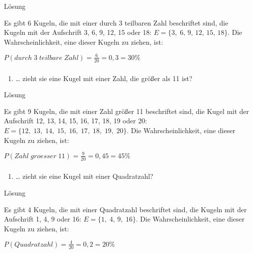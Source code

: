 \documentclass[
  ngerman,
]{book}
\providecommand{\tightlist}{%
  \setlength{\itemsep}{0pt}\setlength{\parskip}{0pt}}
\begin{document}
Lösung

Es gibt 6 Kugeln, die mit einer durch 3 teilbaren Zahl beschriftet sind, die Kugeln mit der Aufschrift 3, 6, 9, 12, 15 oder 18: \(E=\{3,\;6,\,9,\,12,\,15,\,18\}\). Die Wahrscheinlichkeit, eine dieser Kugeln zu ziehen, ist:

\(P(durch\;3\;teilbare\;Zahl)=\frac{6}{20}=0,3=30\%\)

\hypertarget{section-89}{%
\subsubsection*{}\label{section-89}}

\begin{enumerate}
\def\labelenumi{\alph{enumi})}
\setcounter{enumi}{2}
\tightlist
\item
  \ldots{} zieht sie eine Kugel mit einer Zahl, die größer als 11 ist?
\end{enumerate}

Lösung

Es gibt 9 Kugeln, die mit einer Zahl größer 11 beschriftet sind, die Kugel mit der Aufschrift 12, 13, 14, 15, 16, 17, 18, 19 oder 20: \(E=\{12,\;13,\;14,\;15,\;16,\;17,\;18,\;19,\;20\}\). Die Wahrscheinlichkeit, eine dieser Kugeln zu ziehen, ist:

\(P(Zahl\;groesser\;11)=\frac{9}{20}=0,45=45\%\)

\hypertarget{section-90}{%
\subsubsection*{}\label{section-90}}

\begin{enumerate}
\def\labelenumi{\alph{enumi})}
\setcounter{enumi}{3}
\tightlist
\item
  \ldots{} zieht sie eine Kugel mit einer Quadratzahl?
\end{enumerate}

Lösung

Es gibt 4 Kugeln, die mit einer Quadratzahl beschriftet sind, die Kugeln mit der Aufschrift 1, 4, 9 oder 16: \(E=\{1,\;4,\,9,\;16\}\). Die Wahrscheinlichkeit, eine dieser Kugeln zu ziehen, ist:

\(P(Quadratzahl)=\frac{4}{20}=0,2=20\%\)

\hypertarget{section-91}{%
\subsubsection*{}\label{section-91}}
\end{document}
